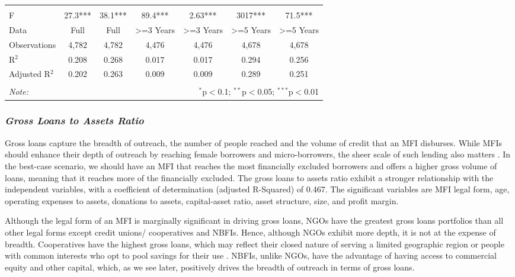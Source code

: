\documentclass[a4paper,nobind]{templates/ociamthesis}
\begin{document}
\begin{landscape}
\begin{table}[!htbp]
\begin{tabular}{@{\extracolsep{5pt}}lcccccc}
\hline \\[-1.8ex] 
F & 27.3*** & 38.1*** & 89.4*** & 2.63*** & 3017*** & 71.5*** \\ 
Data & Full & Full & >=3 Years & >=3 Years & >=5 Years & >=5 Years \\ 
Observations & 4,782 & 4,782 & 4,476 & 4,476 & 4,678 & 4,678 \\ 
R$^{2}$ & 0.208 & 0.268 & 0.017 & 0.017 & 0.294 & 0.256 \\ 
Adjusted R$^{2}$ & 0.202 & 0.263 & 0.009 & 0.009 & 0.289 & 0.251 \\ 
\hline 
\hline \\[-1.8ex] 
\textit{Note:}  & \multicolumn{6}{r}{$^{*}$p$<$0.1; $^{**}$p$<$0.05; $^{***}$p$<$0.01} \\ 
\end{tabular} 
\end{table}

\end{landscape}

\hypertarget{gross-loans-to-assets-ratio}{%
\subsubsection{\texorpdfstring{\textbf{\emph{Gross Loans to Assets Ratio}}}{Gross Loans to Assets Ratio}}\label{gross-loans-to-assets-ratio}}

Gross loans capture the breadth of outreach, the number of people reached and the volume of credit that an MFI disburses. While MFIs should enhance their depth of outreach by reaching female borrowers and micro-borrowers, the sheer scale of such lending also matters \autocite{d2013unsubsidized}. In the best-case scenario, we should have an MFI that reaches the most financially excluded borrowers and offers a higher gross volume of loans, meaning that it reaches more of the financially excluded. The gross loans to assets ratio exhibit a stronger relationship with the independent variables, with a coefficient of determination (adjusted R-Squared) of 0.467. The significant variables are MFI legal form, age, operating expenses to assets, donations to assets, capital-asset ratio, asset structure, size, and profit margin.

Although the legal form of an MFI is marginally significant in driving gross loans, NGOs have the greatest gross loans portfolios than all other legal forms except credit unions/ cooperatives and NBFIs. Hence, although NGOs exhibit more depth, it is not at the expense of breadth. Cooperatives have the highest gross loans, which may reflect their closed nature of serving a limited geographic region or people with common interests who opt to pool savings for their use \autocite{mckillop2011credit}. NBFIs, unlike NGOs, have the advantage of having access to commercial equity and other capital, which, as we see later, positively drives the breadth of outreach in terms of gross loans.
\end{document}
